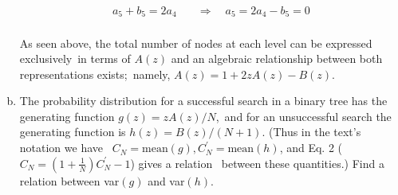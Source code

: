 \documentclass[fontsize=11pt, paper=a4]{scrartcl}
\begin{document}
\begin{enumerate}[(a), leftmargin=1.5cm]
\begin{align*}
            a_{5} + b_{5} = 2a_{4}  \quad&\Longrightarrow\quad a_{5} = 2a_{4} - b_{5} = 0\\
        \end{align*}
        \begin{tcolorbox}[breakable, colback=white, colframe=white]
            \qquad As seen above, the total number of nodes at each level can be expressed exclusively\ 
            in terms of $A(z)$ and an algebraic relationship between both representations exists;\
            namely, $A(z)=1+2zA(z)-B(z)$.
        \end{tcolorbox}
    \item The probability distribution for a successful search in a binary tree has the generating function $g(z) = zA(z)/N$,\
            and for an unsuccessful search the generating function is $h(z) = B(z)/(N + 1)$. (Thus in the text’s notation we have \ 
            $C_{N} = \text{mean}(g), C^{'}_{N} = \text{mean}(h)$, and Eq. 2 ($C_{N}=(1+\frac{1}{N})C^{'}_{N}-1$) gives a relation \ 
            between these quantities.) Find a relation between var$(g)$ and var$(h)$.
\end{enumerate}
\end{document}
